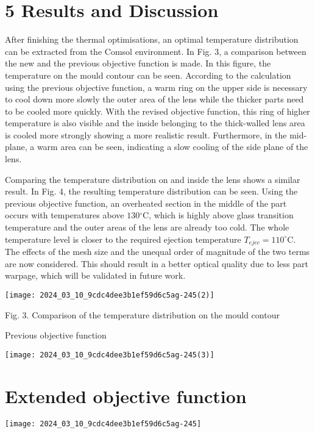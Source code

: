 \documentclass[10pt]{article}
\begin{document}
\section*{5 Results and Discussion}
After finishing the thermal optimisations, an optimal temperature distribution can be extracted from the Comsol environment. In Fig. 3, a comparison between the new and the previous objective function is made. In this figure, the temperature on the mould contour can be seen. According to the calculation using the previous objective function, a warm ring on the upper side is necessary to cool down more slowly the outer area of the lens while the thicker parts need to be cooled more quickly. With the revised objective function, this ring of higher temperature is also visible and the inside belonging to the thick-walled lens area is cooled more strongly showing a more realistic result. Furthermore, in the mid-plane, a warm area can be seen, indicating a slow cooling of the side plane of the lens.

Comparing the temperature distribution on and inside the lens shows a similar result. In Fig. 4, the resulting temperature distribution can be seen. Using the previous objective function, an overheated section in the middle of the part occurs with temperatures above $130{ }^{\circ} \mathrm{C}$, which is highly above glass transition temperature and the outer areas of the lens are already too cold. The whole temperature level is closer to the required ejection temperature $T_{e j e c}=110^{\circ} \mathrm{C}$. The effects of the mesh size and the unequal order of magnitude of the two terms are now considered. This should result in a better optical quality due to less part warpage, which will be validated in future work.

\begin{center}
\texttt{[image: 2024\_03\_10\_9cdc4dee3b1ef59d6c5ag-245(2)]}
\end{center}

Fig. 3. Comparison of the temperature distribution on the mould contour

Previous objective function

\begin{center}
\texttt{[image: 2024\_03\_10\_9cdc4dee3b1ef59d6c5ag-245(3)]}
\end{center}

\section*{Extended objective function}
\begin{center}
\texttt{[image: 2024\_03\_10\_9cdc4dee3b1ef59d6c5ag-245]}
\end{center}
\end{document}
